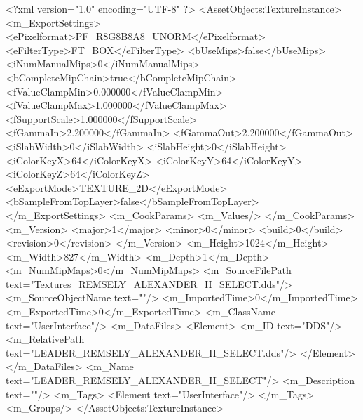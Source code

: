 <?xml version="1.0" encoding="UTF-8" ?>
<AssetObjects:TextureInstance>
	<m_ExportSettings>
		<ePixelformat>PF_R8G8B8A8_UNORM</ePixelformat>
		<eFilterType>FT_BOX</eFilterType>
		<bUseMips>false</bUseMips>
		<iNumManualMips>0</iNumManualMips>
		<bCompleteMipChain>true</bCompleteMipChain>
		<fValueClampMin>0.000000</fValueClampMin>
		<fValueClampMax>1.000000</fValueClampMax>
		<fSupportScale>1.000000</fSupportScale>
		<fGammaIn>2.200000</fGammaIn>
		<fGammaOut>2.200000</fGammaOut>
		<iSlabWidth>0</iSlabWidth>
		<iSlabHeight>0</iSlabHeight>
		<iColorKeyX>64</iColorKeyX>
		<iColorKeyY>64</iColorKeyY>
		<iColorKeyZ>64</iColorKeyZ>
		<eExportMode>TEXTURE_2D</eExportMode>
		<bSampleFromTopLayer>false</bSampleFromTopLayer>
	</m_ExportSettings>
	<m_CookParams>
		<m_Values/>
	</m_CookParams>
	<m_Version>
		<major>1</major>
		<minor>0</minor>
		<build>0</build>
		<revision>0</revision>
	</m_Version>
	<m_Height>1024</m_Height>
	<m_Width>827</m_Width>
	<m_Depth>1</m_Depth>
	<m_NumMipMaps>0</m_NumMipMaps>
	<m_SourceFilePath text="Textures\LEADER_REMSELY_ALEXANDER_II_SELECT.dds"/>
	<m_SourceObjectName text=""/>
	<m_ImportedTime>0</m_ImportedTime>
	<m_ExportedTime>0</m_ExportedTime>
	<m_ClassName text="UserInterface"/>
	<m_DataFiles>
		<Element>
			<m_ID text="DDS"/>
			<m_RelativePath text="LEADER_REMSELY_ALEXANDER_II_SELECT.dds"/>
		</Element>
	</m_DataFiles>
	<m_Name text="LEADER_REMSELY_ALEXANDER_II_SELECT"/>
	<m_Description text=""/>
	<m_Tags>
		<Element text="UserInterface"/>
	</m_Tags>
	<m_Groups/>
</AssetObjects:TextureInstance>
